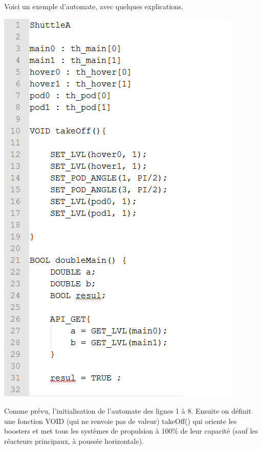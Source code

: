 \documentclass[a4paper,11pt]{article}
\begin{document}
        Voici un exemple d'automate, avec quelques explications.
        \begin{center}
            \includegraphics[scale=0.75]{img/otto1.png}
        \end{center}

        Comme prévu, l'initialisation de l'automate des lignes 1 à 8. Ensuite on définit une fonction VOID (qui ne renvoie pas de valeur) takeOff() qui oriente les boosters et met tous les systèmes de propulsion à 100\% de leur capacité (sauf les réacteurs principaux, à poussée horizontale). 
\end{document}
